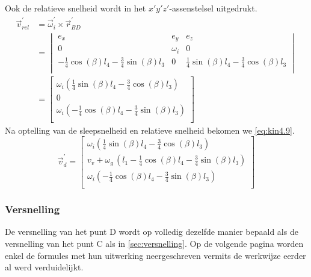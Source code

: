 Ook de relatieve snelheid wordt in het $x'y'z'$-assenstelsel uitgedrukt.
\begin{equation}
\begin{split}
\vec{v}_{rel}^{'}&=\vec{\omega}_{i}^{'}\times\vec{r}_{BD}^{'}\\
&=\begin{vmatrix}
e_{x}&e_{y}&e_{z}\\
0&\omega_{i}&0\\
-\frac{1}{4}\cos(\beta)l_{4}-\frac{3}{4}\sin(\beta)l_{3}&0&\frac{1}{4}\sin(\beta)l_{4}-\frac{3}{4}\cos(\beta)l_{3}\\
\end{vmatrix}\\
&=\begin{bmatrix}
\omega_{i}(\frac{1}{4}\sin(\beta)l_{4}-\frac{3}{4}\cos(\beta)l_{3})\\0\\\omega_{i}(-\frac{1}{4}\cos(\beta)l_{4}-\frac{3}{4}\sin(\beta)l_{3})\\
\end{bmatrix}
\end{split}
\label{eq:kin4.8}
\end{equation}
Na optelling van de sleepsnelheid en relatieve snelheid bekomen we \eqref{eq:kin4.9}.
\begin{equation}
\vec{v}_{d}^{'}=
\begin{bmatrix}
\omega_{i}(\frac{1}{4}\sin(\beta)l_{4}-\frac{3}{4}\cos(\beta)l_{3})\\v_{v}+\omega_{g}\,\left(l_{1}-\frac{1}{4}\cos(\beta)l_{4}-\frac{3}{4}\sin(\beta)l_{3}\right)\\
\omega_{i}(-\frac{1}{4}\cos(\beta)l_{4}-\frac{3}{4}\sin(\beta)l_{3})\\
\end{bmatrix}
\label{eq:kin4.9}
\end{equation}
\subsubsection{Versnelling}
\label{sec:3.4.2}
De versnelling van het punt D wordt op volledig dezelfde manier bepaald als de versnelling van het punt C als in \ref{sec:versnelling}. Op de volgende pagina worden enkel de formules met hun uitwerking neergeschreven vermits de werkwijze eerder al werd verduidelijkt.

